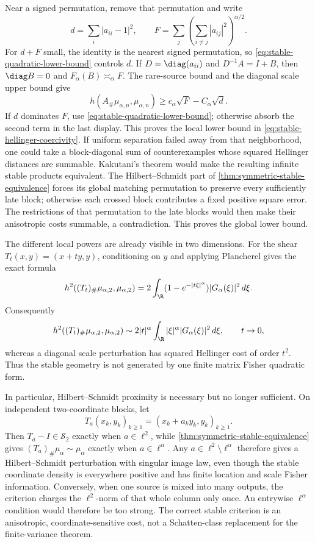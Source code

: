 Near a signed permutation, remove that permutation and write
\[
 d=\sum_i|a_{ii}-1|^2,
 \qquad
 F=\sum_j\left(\sum_{i\ne j}|a_{ij}|^2\right)^{\alpha/2}.
\]
For \(d+F\) small, the identity is the nearest signed permutation, so
\eqref{eq:stable-quadratic-lower-bound} controls \(d\).
If \(D=\diag(a_{ii})\) and \(D^{-1}A=I+B\), then
\(\diag B=0\) and \(F_\alpha(B)\asymp_\alpha F\).
The rare-source bound and the diagonal scale upper bound give
\[
 h(A_\#\mu_{\alpha,n},\mu_{\alpha,n})
 \ge c_\alpha\sqrt F-C_\alpha\sqrt d.
\]
If \(d\) dominates \(F\), use
\eqref{eq:stable-quadratic-lower-bound}; otherwise absorb the second term in
the last display.
This proves the local lower bound in
\eqref{eq:stable-hellinger-coercivity}.
If uniform separation failed away from that neighborhood, one could take a
block-diagonal sum of counterexamples whose squared Hellinger distances are
summable.
Kakutani's theorem would make the resulting infinite stable products
equivalent.
The Hilbert--Schmidt part of \cref{thm:symmetric-stable-equivalence} forces
its global matching permutation to preserve every sufficiently late block;
otherwise each crossed block contributes a fixed positive square error.
The restrictions of that permutation to the late blocks would then make
their anisotropic costs summable, a contradiction.
This proves the global lower bound.

The different local powers are already visible in two dimensions.
For the shear \(T_t(x,y)=(x+ty,y)\), conditioning on \(y\) and applying
Plancherel gives the exact formula
\begin{equation}
 h^2((T_t)_\#\mu_{\alpha,2},\mu_{\alpha,2})
 =2\int_\R(1-e^{-|t\xi|^\alpha})
                  |G_\alpha(\xi)|^2\,d\xi.
 \label{eq:stable-shear-hellinger-formula}
\end{equation}
Consequently
\[
 h^2((T_t)_\#\mu_{\alpha,2},\mu_{\alpha,2})
 \sim2|t|^\alpha\int_\R|\xi|^\alpha
                         |G_\alpha(\xi)|^2\,d\xi,
 \qquad t\to0,
\]
whereas a diagonal scale perturbation has squared Hellinger cost of order
\(t^2\).
Thus the stable geometry is not generated by one finite matrix Fisher
quadratic form.

In particular, Hilbert--Schmidt proximity is necessary but no longer
sufficient.
On independent two-coordinate blocks, let
\[
 T_a(x_k,y_k)_{k\ge1}=(x_k+a_ky_k,y_k)_{k\ge1}.
\]
Then \(T_a-I\in\mathcal S_2\) exactly when \(a\in\ell^2\), while
\cref{thm:symmetric-stable-equivalence} gives
\((T_a)_\#\mu_\alpha\sim\mu_\alpha\) exactly when
\(a\in\ell^\alpha\).
Any \(a\in\ell^2\setminus\ell^\alpha\) therefore gives a
Hilbert--Schmidt perturbation with singular image law, even though the
stable coordinate density is everywhere positive and has finite location
and scale Fisher information.
Conversely, when one source is mixed into many outputs, the criterion
charges the \(\ell^2\)-norm of that whole column only once.
An entrywise \(\ell^\alpha\) condition would therefore be too strong.
The correct stable criterion is an anisotropic, coordinate-sensitive cost,
not a Schatten-class replacement for the finite-variance theorem.
